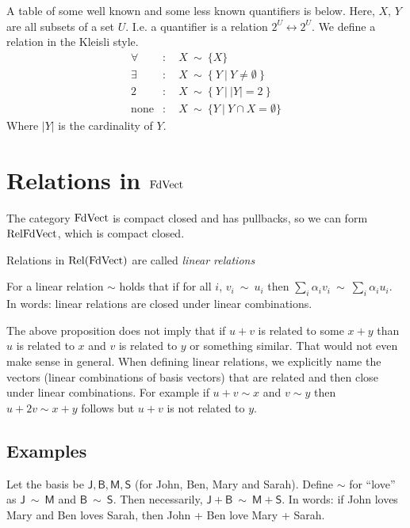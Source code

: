 A table of some well known and
some less known quantifiers is below. Here, $X,\,Y$ are all
subsets of a set $U$. I.e. a quantifier is a relation $2^U
\longleftrightarrow 2^U$. We define a relation in the Kleisli style.
\begin{align*}
\forall &:\quad X ~ \sim ~\{X\}\\
\exists &:\quad X ~ \sim ~ \{~Y ~|~ Y \neq \emptyset
~ \}\\
2 &:\quad X ~\sim ~\{~Y ~|~ |Y| = 2~ \}\\
\mathrm{none} & : \quad X ~ \sim ~ \{Y ~|~ Y \cap X = \emptyset \}
\end{align*}
Where $|Y|$ is the cardinality of $Y$.


\section{Relations in $\mathrm{FdVect}$}
The category $\mathrm{FdVect}$ is compact closed and has pullbacks, so we
can form $\mathrm{Rel}{\mathrm{FdVect}}$, which is compact closed. 

\begin{definition}
Relations in $\mathrm{Rel}(\mathrm{FdVect})$ are called \emph{linear relations}
\end{definition}

\begin{proposition}
  For a linear relation $\sim$ holds that if for all $i$, $v_i
  ~\sim~u_i$ then $\sum_i \alpha_i v_i ~\sim ~ \sum_i \alpha_i
  u_i$. In words: linear relations are closed under linear
  combinations.
\end{proposition}

\begin{remark}
The above proposition does not imply that if $u + v$ is related
to some $x + y$ than $u$ is related to $x$ and $v$ is related to $y$
or something similar. That would not even make sense in general. When
defining linear relations, we explicitly name the vectors (linear
combinations of basis vectors) that are related and then close
under linear combinations. For example if $u + v  \sim x$ and $v \sim
y$ then $u + 2v \sim x + y$ follows but $u + v$ is not related to $y$.
\end{remark}

\subsection{Examples}
Let the basis be $\mathsf{J}, \mathsf{B}, \mathsf{M}, \mathsf{S}$ (for
John, Ben, Mary and Sarah). Define $\sim$ for ``love'' as $\mathsf{J}
~\sim~\mathsf{M}$ and $\mathsf{B}~\sim~\mathsf{S}$. Then necessarily,
$\mathsf{J} + \mathsf{B} ~\sim~\mathsf{M}+\mathsf{S}$. In words: if
John loves Mary and Ben loves Sarah, then John + Ben love Mary +
Sarah. 

